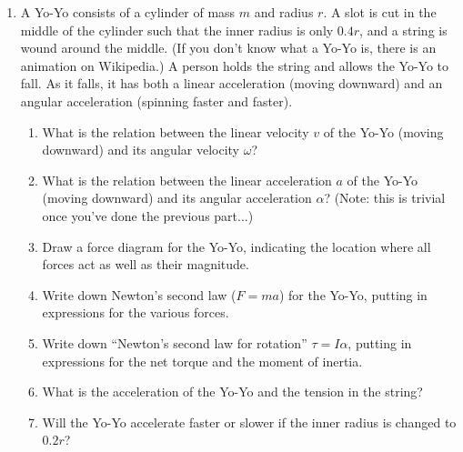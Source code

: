 \documentclass[12pt]{article}
\begin{document}
\begin{enumerate}
   \item{A Yo-Yo consists of a cylinder of mass $m$ and radius $r$. A slot is cut in the middle of the cylinder such that the inner radius is only $0.4r$, and a string is wound around the middle. (If you don't know what a Yo-Yo is, there is an animation on Wikipedia.)
     A person holds the string and allows the Yo-Yo to fall. As it falls, it has both a linear acceleration (moving downward) and an angular acceleration (spinning faster and faster).}
     \begin{enumerate}
       \item{What is the relation between the linear velocity $v$ of the Yo-Yo (moving downward) and its angular velocity $\omega$?}

\vspace{1in}
       \item{What is the relation between the linear acceleration $a$ of the Yo-Yo (moving downward) and its angular acceleration $\alpha$? (Note: this is trivial once you've done the previous part...)}

\vspace{1in}

       \item{Draw a force diagram for the Yo-Yo, indicating the location where all forces act as well as their magnitude.}

\vspace{3in}

       \item{Write down Newton's second law ($F=ma$) for the Yo-Yo, putting in expressions for the various forces.}

\vspace{2in}

       \item{Write down ``Newton's second law for rotation'' $\tau = I \alpha$, putting in expressions for the net torque and the moment of inertia.}

\vspace{2in}
       \item{What is the acceleration of the Yo-Yo and the tension in the string?}

\vspace{3in}
       \item{Will the Yo-Yo accelerate faster or slower if the inner radius is changed to $0.2r$?}


     \end{enumerate}
\end{enumerate}
\newpage
\centerline{}
\end{document}
